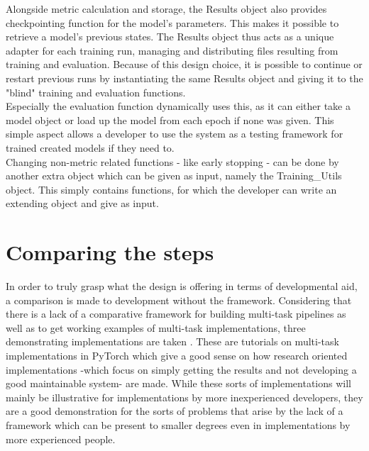Alongside metric calculation and storage, the Results object also provides checkpointing function for the model's parameters. This makes it possible to retrieve a model's previous states. The Results object thus acts as a unique adapter for each training run, managing and distributing files resulting from training and evaluation. Because of this design choice, it is possible to continue or restart previous runs by instantiating the same Results object and giving it to the "blind" training and evaluation functions. \\

Especially the evaluation function dynamically uses this, as it can either take a model object or load up the model from each epoch if none was given. This simple aspect allows a developer to use the system as a testing framework for trained created models if they need to. \\

Changing non-metric related functions - like early stopping - can be done by another extra object which can be given as input, namely the Training\_Utils object. This simply contains functions, for which the developer can write an extending object and give as input. \\ 

\section{Comparing the steps} \label{Design:Comparing}

In order to truly grasp what the design is offering in terms of developmental aid, a comparison is made to development without the framework. Considering that there is a lack of a comparative framework for building multi-task pipelines as well as to get working examples of multi-task implementations, three demonstrating implementations are taken \cite{pytorchmultitask} \cite{multiclasstutorial} \cite{multidataset}. These are tutorials on multi-task implementations in PyTorch which give a good sense on how research oriented implementations -which focus on simply getting the results and not developing a good maintainable system- are made. While these sorts of implementations will mainly be illustrative for implementations by more inexperienced developers, they are a good demonstration for the sorts of problems that arise by the lack of a framework which can be present to smaller degrees even in implementations by more experienced people.\\

